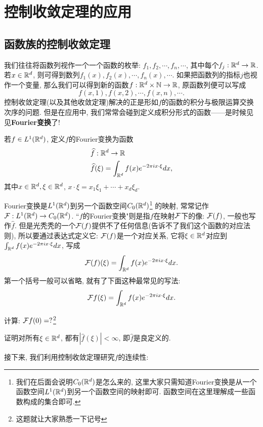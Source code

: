\section{控制收敛定理的应用}\label{DCT}
\subsection{函数族的控制收敛定理}
我们往往将函数列视作一个一个函数的枚举: $f_1, f_2, \cdots, f_n, \cdots$, 其中每个$f_j: \mathbb{R}^d \to \mathbb{R}$. 若$x \in \mathbb{R}^d$, 则可得到数列$f_1(x), f_2(x), \cdots, f_n(x), \cdots$. 如果把函数列的指标$j$也视作一个变量, 那么我们可以得到新的函数$f: \mathbb{R}^d \times \mathbb{N} \to \mathbb{R}$, 原函数列便可以写成
$$f(x,1), f(x,2), \cdots, f(x,n), \cdots. $$
控制收敛定理(以及其他收敛定理)解决的正是形如$f$的函数的积分与极限运算交换次序的问题. 但是在应用中, 我们常常会碰到定义成积分形式的函数——是时候见见\textbf{Fourier变换}了!
\begin{definition}
    若$f \in L^1(\mathbb{R}^d)$, 定义$f$的Fourier变换为函数
    \begin{align*}
    &\widehat{f}: \mathbb{R}^d \to \mathbb{R} \\
    &\widehat{f}(\xi) = \int_{\mathbb{R}^d} f(x)e^{-2\pi ix \cdot \xi} dx,
    \end{align*}
    其中$x \in \mathbb{R}^d, \xi \in \mathbb{R}^d$, $x \cdot \xi = x_1\xi_1 + \cdots + x_d\xi_d$.
\end{definition}
\begin{remark}
    Fourier变换是$L^1(\mathbb{R}^d)$到另一个函数空间$C_0(\mathbb{R}^d)$\footnote{我们在后面会说明$C_0(\mathbb{R}^d)$是怎么来的, 这里大家只需知道Fourier变换是从一个函数空间$L^1(\mathbb{R}^d)$到另一个函数空间的映射即可. 函数空间在这里理解成一些函数构成的集合即可. }
    的映射, 常常记作$\mathcal{F}: L^1(\mathbb{R}^d) \to C_0(\mathbb{R}^d)$. ``$f$的Fourier变换"则是指$f$在映射$\mathcal{F}$下的像: $\mathcal{F}(f)$, 一般也写作$\hat{f}$. 但是光秃秃的一个$\mathcal{F}(f)$提供不了任何信息(告诉不了我们这个函数的对应法则), 所以要通过表达式定义它: $\mathcal{F}(f)$是一个对应关系, 它将$\xi \in \mathbb{R}^d$对应到
    $\int_{\mathbb{R}^d} f(x)e^{-2\pi ix \cdot \xi} dx$, 写成
    $$\mathcal{F}(f)(\xi) = \int_{\mathbb{R}^d} f(x)e^{-2\pi ix \cdot \xi} dx.$$ 第一个括号一般可以省略, 就有了下面这种最常见的写法:
    $$\mathcal{F} f(\xi) = \int_{\mathbb{R}^d} f(x)e^{-2\pi ix \cdot \xi} dx.$$
\end{remark}
\begin{exercise}
    计算: $\mathcal{F} f(0)=?$\footnote{这题就让大家熟悉一下记号}
\end{exercise}
\begin{exercise}
    证明对所有$\xi \in \mathbb{R}^d$, 都有$|\hat{f}(\xi)|<\infty$, 即$\hat{f}$是良定义的.
\end{exercise}
接下来, 我们利用控制收敛定理研究$\hat{f}$的连续性:
